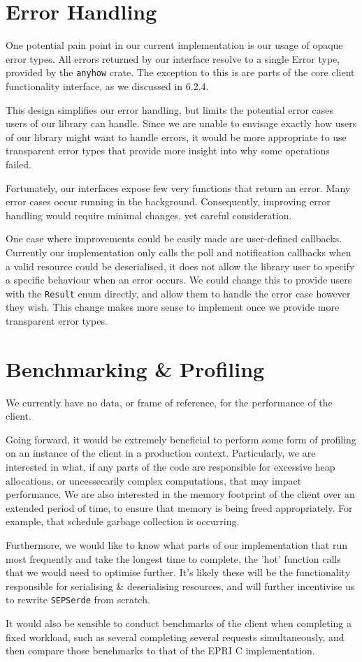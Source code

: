 \section{Error Handling}
One potential pain point in our current implementation is our usage of opaque error types. All errors returned by our interface resolve to a single Error type, provided by the \texttt{anyhow} crate. The exception to this is are parts of the core client functionality interface, as we discussed in 6.2.4.

This design simplifies our error handling, but limits the potential error cases users of our library can handle. Since we are unable to envisage exactly how users of our library might want to handle errors, it would be more appropriate to use transparent error types that provide more insight into why some operations failed.

Fortunately, our interfaces expose few very functions that return an error. Many error cases occur running in the background. Consequently, improving error handling would require minimal changes, yet careful consideration.

One case where improvements could be easily made are user-defined callbacks. Currently our implementation only calls the poll and notification callbacks when a valid resource could be deserialised, it does not allow the library user to specify a specific behaviour when an error occurs. We could change this to provide users with the \texttt{Result} enum directly, and allow them to handle the error case however they wish. This change makes more sense to implement once we provide more transparent error types.   

\section{Benchmarking \& Profiling}
We currently have no data, or frame of reference, for the performance of the client. 

Going forward, it would be extremely beneficial to perform some form of profiling on an instance of the client in a production context. Particularly, we are interested in what, if any parts of the code are responsible for excessive heap allocations, or uncessecarily complex computations, that may impact performance.
We are also interested in the memory footprint of the client over an extended period of time, to ensure that memory is being freed appropriately. For example, that schedule garbage collection is occurring. 

Furthermore, we would like to know what parts of our implementation that run most frequently and take the longest time to complete, the 'hot' function calls that we would need to optimise further. It's likely these will be the functionality responsible for serialising \& deserialising resources, and will further incentivise us to rewrite \texttt{SEPSerde} from scratch.

It would also be sensible to conduct benchmarks of the client when completing a fixed workload, such as several completing several requests simultaneously, and then compare those benchmarks to that of the EPRI C implementation.

